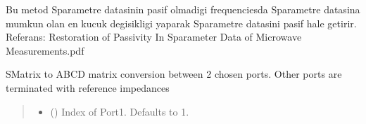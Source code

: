 \documentclass[letterpaper,10pt,english]{sphinxmanual}
\begin{document}
\begin{fulllineitems}
\begin{fulllineitems}
\begin{quote}
\begin{description}
\sphinxAtStartPar
{\hyperref[\detokenize{touchstone:touchstone.spfile}]{}}

\end{description}\end{quote}

\end{fulllineitems}


\begin{fulllineitems}
\label{\detokenize{touchstone:touchstone.spfile.restore_passivity2}}
\pysigstartsignatures
{}
\pysigstopsignatures
\sphinxAtStartPar
{}
Bu metod S\sphinxhyphen{}parametre datasinin pasif olmadigi frequenciesda
S\sphinxhyphen{}parametre datasina mumkun olan en kucuk degisikligi yaparak
S\sphinxhyphen{}parametre datasini pasif hale getirir.
Referans:
Restoration of Passivity In S\sphinxhyphen{}parameter Data of Microwave Measurements.pdf

\end{fulllineitems}


\begin{fulllineitems}
\label{\detokenize{touchstone:touchstone.spfile.return_s2p}}
\pysigstartsignatures
{}
\pysigstopsignatures
\end{fulllineitems}


\begin{fulllineitems}
\label{\detokenize{touchstone:touchstone.spfile.s2abcd}}
\pysigstartsignatures
{}
\pysigstopsignatures
\sphinxAtStartPar
S\sphinxhyphen{}Matrix to ABCD matrix conversion between 2 chosen ports. Other ports are terminated with reference impedances
\begin{quote}\begin{description}
\begin{itemize}
\item {} 
\sphinxAtStartPar
{} (\sphinxstyleliteralemphasis{\sphinxupquote{, }}) \textendash{} Index of Port\sphinxhyphen{}1. Defaults to 1.


\end{itemize}
\end{description}
\end{quote}
\end{fulllineitems}
\end{fulllineitems}
\end{document}
